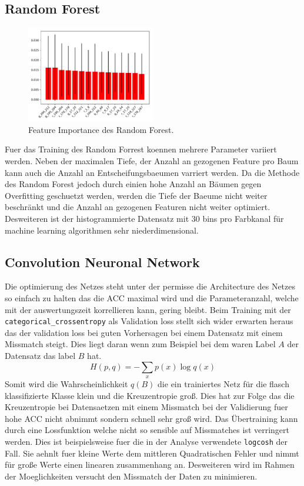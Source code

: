 \subsection{Random Forest}%
\label{sub:random_forest}
\begin{figure}
		\centering
		\includegraphics[width=0.5\textwidth]{./pictures/train_rf.pdf}
		\caption{Feature Importance des Random Forest.}
		\label{fig:}
\end{figure}
Fuer das Training des Random Forrest koennen mehrere Parameter variiert werden.
Neben der maximalen Tiefe, der Anzahl an gezogenen Feature pro Baum kann auch 
die Anzahl an Entscheifungsbaeumen varriert werden.
Da die Methode des Random Forest jedoch durch einien hohe Anzahl an Bäumen
gegen Overfitting geschuetzt werden, werden die Tiefe der Baeume nicht weiter
beschränkt und die Anzahl an gezogenen Featuren nicht weiter optimiert.
Desweiteren ist der histogrammierte Datensatz mit 30 bins pro Farbkanal für
machine learning algorithmen sehr niederdimensional.

\subsection{Convolution Neuronal Network}%
\label{sub:convolution_neuronal_network}

Die optimierung des Netzes steht unter der permisse die Architecture des Netzes
so einfach zu halten das die ACC maximal wird und die Parameteranzahl, welche 
mit der auswertungszeit korrellieren kann, gering bleibt. 
Beim Training mit der \texttt{categorical\_crossentropy} als Validation loss stellt sich 
wider erwarten heraus das der validation loss bei guten Vorhersagen bei einem
Datensatz mit einem Missmatch steigt. 
Dies liegt daran wenn zum Beispiel bei dem waren Label $A$ der Datensatz das label
$B$ hat. 
\begin{equation}
		H(p,q) = -\sum_x p(x) \log q(x)
\end{equation}
Somit wird die Wahrscheinlichkeit $q(B)$ die ein trainiertes Netz für die 
flasch klassifizierte Klasse klein und die Kreuzentropie groß.
Dies hat zur Folge das die Kreuzentropie bei Datensaetzen mit einem Missmatch
bei der Validierung fuer hohe ACC nicht abnimmt sondern schnell sehr groß wird.
Das Übertraining kann durch eine Lossfunktion welche nicht so sensible auf
Missmatches ist verringert werden. 
Dies ist beispielsweise fuer die in der Analyse verwendete \texttt{logcosh} der
Fall. 
Sie aehnlt fuer kleine Werte dem mittleren Quadratischen Fehler und nimmt für
große Werte einen linearen zusammenhang an.
Desweiteren wird im Rahmen der Moeglichkeiten versucht den Missmatch der Daten 
zu minimieren.

